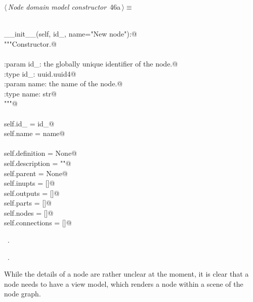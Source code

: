 \documentclass[
    a4paper,      %
    10pt,         %
    openright,    %
    notitlepage,  %
    parskip=half, %
]{scrreprt}       %
\theoremstyle{definition}                    %
\begin{document}
\begin{flushleft} \small
\begin{minipage}{\linewidth}\label{scrap58}\raggedright\small
{} $\langle\,${\itshape Node domain model constructor}\nobreak\ {\footnotesize {46a}}$\,\rangle\equiv$
\vspace{-1exm}
\begin{list}{}{} \item
\mbox{}\lstinline@@\\
\mbox{}\lstinline@def __init__(self, id_, name="New node"):@\\
\mbox{}\lstinline@    """Constructor.@\\
\mbox{}\lstinline@@\\
\mbox{}\lstinline@    :param id_: the globally unique identifier of the node.@\\
\mbox{}\lstinline@    :type  id_: uuid.uuid4@\\
\mbox{}\lstinline@    :param name: the name of the node.@\\
\mbox{}\lstinline@    :type  name: str@\\
\mbox{}\lstinline@    """@\\
\mbox{}\lstinline@@\\
\mbox{}\lstinline@    self.id_   = id_@\\
\mbox{}\lstinline@    self.name = name@\\
\mbox{}\lstinline@@\\
\mbox{}\lstinline@    self.definition = None@\\
\mbox{}\lstinline@    self.description = ""@\\
\mbox{}\lstinline@    self.parent = None@\\
\mbox{}\lstinline@    self.inupts = []@\\
\mbox{}\lstinline@    self.outputs = []@\\
\mbox{}\lstinline@    self.parts = []@\\
\mbox{}\lstinline@    self.nodes = []@\\
\mbox{}\lstinline@    self.connections = []@\\
\mbox{}\lstinline@@{\NWsep}
\end{list}
\vspace{-1.5ex}
\footnotesize
\begin{list}{}{\setlength{\itemsep}{-\parsep}\setlength{\itemindent}{-\leftmargin}}
\item \NWtxtMacroDefBy\ .
\item \NWtxtMacroRefIn\ .

\item{}
\end{list}
\end{minipage}\vspace{4ex}
\end{flushleft}
While the details of a node are rather unclear at the moment, it is clear that
a node needs to have a view model, which renders a node within a scene of the
node graph.
\end{document}
